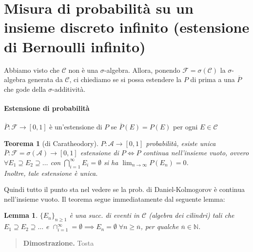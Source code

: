 \documentclass[a4paper,10pt]{article}
\newtheorem*{lem}{Lemma}
\newtheorem*{theorem}{Teorema}
\theoremstyle{remark}
\theoremstyle{definition}
\newenvironment{dimo}{\begin{quote}\textbf{Dimostrazione.}}{\end{quote}} %
\begin{document}
\section{Misura di probabilità su un insieme discreto infinito (estensione di Bernoulli infinito)}
Abbiamo visto che $\mathscr{C}$ non è una $\sigma$-algebra. Allora, ponendo $\mathscr{F}=\sigma(\mathscr{C})$ la $\sigma$-algebra generata da $\mathscr{C}$, ci chiediamo se si possa estendere la $P$ di prima a una $\overline{P}$ che gode della $\sigma$-additività.

\paragraph*{Estensione di probabilità} $\overline{P}: \mathscr{F}\to[0,1]$ è un'estensione di $P$ se $\overline{P}(E)=P(E)$ per ogni $E \in \mathscr{C}$

\begin{theorem}[di Caratheodory]

$P:\mathcal{A}\to[0,1]$ probabilità, esiste unica
$\overline{P}:\mathcal{F}=\sigma(\mathcal{A})\to[0,1]$
estensione di $P\iff P$ continua nell'insieme vuoto,
ovvero $\forall E_{1}\supseteq E_{2}\supseteq\dots$ con $\bigcap_{i=1}^{\infty}E_{i}=\emptyset$
si ha $\lim_{n\to\infty}P(E_{n})=0$. \\
Inoltre, tale estensione è unica.
\end{theorem}

Quindi tutto il punto sta nel vedere se la prob. di Daniel-Kolmogorov è continua nell'insieme vuoto. Il teorema segue immediatamente dal seguente lemma:

\begin{lem}
    $\{E_n\}_{n\ge1}$ è una succ. di eventi in $\mathscr{C}$ (algebra dei cilindri) tali che $E_{1}\supseteq E_{2}\supseteq\dots$ e $\cap_{i=1}^\infty=\emptyset \implies E_n=\emptyset \; \forall n\ge\overline{n}$, per qualche $\overline{n}\in\mathbb{N}$. 
\end{lem}

\begin{dimo}
    Tosta
\end{dimo}
\end{document}
